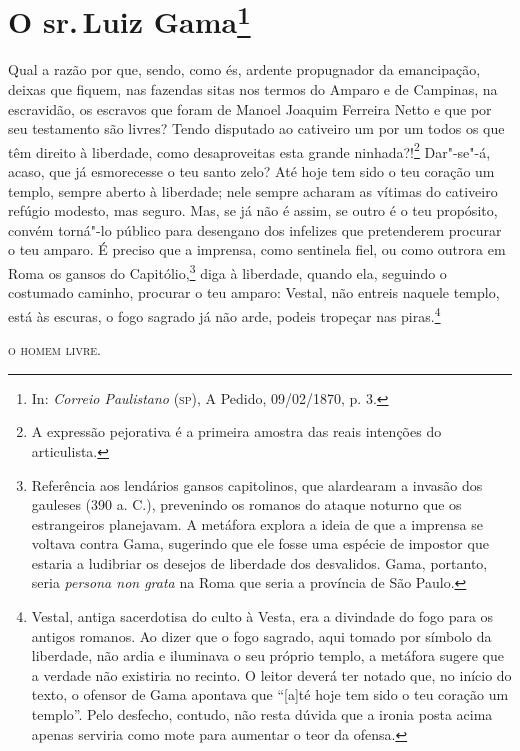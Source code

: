 \chapter{O sr.\,Luiz Gama\footnote[*]{In: \emph{Correio Paulistano}
  (\textsc{sp}), A Pedido, 09/02/1870, p. 3.}}


Qual a razão por que, sendo, como és, ardente propugnador da
emancipação, deixas que fiquem, nas fazendas sitas nos termos do
Amparo e de
Campinas, na escravidão, os escravos que foram de Manoel Joaquim
Ferreira Netto e que por seu testamento são livres? Tendo disputado ao
cativeiro um por um todos os que têm direito à liberdade, como
desaproveitas esta grande ninhada?!\footnote{A expressão pejorativa é
  a primeira amostra das reais intenções do articulista.} Dar"-se"-á,
acaso, que já esmorecesse o teu santo zelo? Até hoje tem sido o teu
coração um templo, sempre aberto à liberdade; nele sempre acharam as
vítimas do cativeiro refúgio modesto, mas seguro. Mas, se já não é
assim, se outro é o teu propósito, convém torná"-lo público para
desengano dos infelizes que pretenderem procurar o teu amparo. É preciso
que a imprensa, como sentinela fiel, ou como outrora em Roma os gansos
do Capitólio,\footnote{Referência aos lendários gansos capitolinos,
  que alardearam a invasão dos gauleses (390 a. C.), prevenindo os
  romanos do ataque noturno que os estrangeiros planejavam. A metáfora
  explora a ideia de que a imprensa se voltava contra Gama, sugerindo
  que ele fosse uma espécie de impostor que estaria a ludibriar os
  desejos de liberdade dos desvalidos. Gama, portanto, seria \emph{persona non
  grata} na Roma que seria a província de São Paulo.} diga à liberdade,
quando ela, seguindo o costumado caminho, procurar o teu amparo: Vestal,
não entreis naquele templo, está às escuras, o fogo sagrado já não arde,
podeis tropeçar nas piras.\footnote{Vestal, antiga sacerdotisa do
  culto à Vesta, era a divindade do fogo para os antigos romanos. Ao
  dizer que o fogo sagrado, aqui tomado por símbolo da liberdade, não
  ardia e iluminava o seu próprio templo, a metáfora sugere que a
  verdade não existiria no recinto. O leitor deverá ter notado que, no
  início do texto, o ofensor de Gama apontava que ``{[}a{]}té hoje tem
  sido o teu coração um templo''. Pelo desfecho, contudo, não resta
  dúvida que a ironia posta acima apenas serviria como mote para
  aumentar o teor da ofensa.}

\bigskip

\hfill\textsc{o homem livre.}

\paginabranca
\mbox{}\vfill
\thispagestyle{empty}

